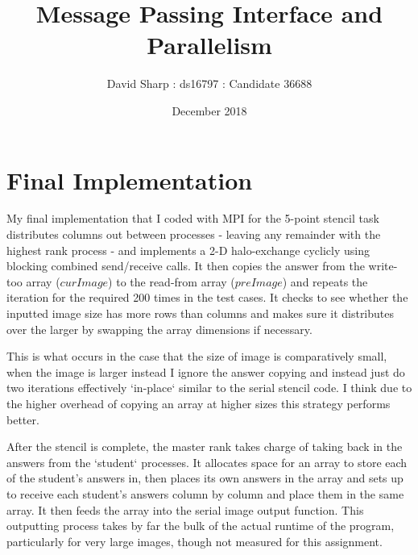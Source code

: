 \documentclass[10pt]{article}
\title{Message Passing Interface and Parallelism}
\author{David Sharp : ds16797 : Candidate 36688}
\date{December 2018}
\begin{document}
    \maketitle
    \section{Final Implementation}
    My final implementation that I coded with MPI for the 5-point stencil task distributes
    columns out between processes - leaving any remainder with the highest rank process - and
    implements a 2-D halo-exchange cyclicly using blocking combined send/receive calls.
    It then copies the answer from the write-too array ($curImage$) to the read-from array
    ($preImage$) and repeats the iteration for the required 200 times in the test cases.
    It checks to see whether the inputted image size has more rows than columns and makes
    sure it distributes over the larger by swapping the array dimensions if necessary.

    This is what occurs in the case that the size of image is comparatively small,
    when the image is larger instead I ignore the answer copying and instead just do two
    iterations effectively `in-place` similar to the serial stencil code. I think due to the
    higher overhead of copying an array at higher sizes this strategy performs better.

    After the stencil is complete, the master rank takes charge of taking back in the answers
    from the `student` processes. It allocates space for an array to store each of the student's
    answers in, then places its own answers in the array and sets up to receive each student's answers
    column by column and place them in the same array. It then feeds the array into the serial
    image output function. This outputting process takes by far the bulk of the actual runtime of
    the program, particularly for very large images, though not measured for this assignment.
\end{document}

